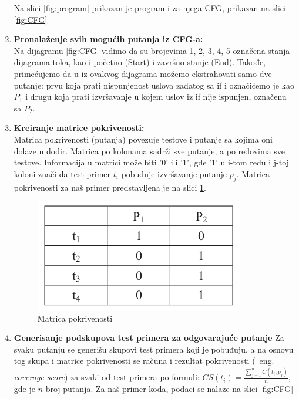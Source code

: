 \documentclass[a4paper]{article}
\begin{document}
\begin{enumerate}
        
        Na slici \ref{fig:program} prikazan je program i za njega CFG, prikazan na slici \ref{fig:CFG}
    \item \textbf{Pronalaženje svih mogućih putanja iz CFG-a:}\\
        Na dijagramu \ref{fig:CFG} vidimo da su brojevima 1, 2, 3, 4, 5 označena stanja dijagrama toka, kao i početno (Start) i završno stanje (End). Takođe, primećujemo da u iz ovakvog dijagrama možemo ekstrahovati samo dve putanje: prvu koja prati nispunjenost uslova zadatog sa if i označićemo je kao $P_1$ i drugu koja prati izvršavanje u kojem uslov iz if nije ispunjen, označenu sa $P_2$.
    \item \textbf{Kreiranje matrice pokrivenosti:} \\
        Matrica pokrivenosti (putanja) povezuje testove i putanje sa kojima oni dolaze u dodir. Matrica po kolonama sadrži sve putanje, a po redovima sve testove. Informacija u matrici može biti '0' ili '1', gde '1' u i-tom redu i j-toj koloni znači da test primer $t_i$ pobuđuje izvršavanje putanje $p_j$. Matrica pokrivenosti za naš primer predstavljena je na slici \ref{fig:pokrivenost}.
        \begin{figure}[h!]
        \begin{center}
        \includegraphics[scale=0.4]{Coverage.png}
        \end{center}
        \caption{Matrica pokrivenosti}
        \label{fig:pokrivenost}
        \end{figure}
    \item \textbf{Generisanje podskupova test primera za odgovarajuće putanje}
    Za svaku putanju se generišu skupovi test primera koji je pobuđuju, a na osnovu tog skupa i matrice pokrivenosti se računa i rezultat pokrivenosti (~eng. \textit{coverage score}) za svaki od test primera po formuli: $CS(t_i) = \frac{\sum_{j=1}^{n}C(t_i, p_j)}{n} $, gde je $n$ broj putanja.
    Za naš primer koda, podaci se nalaze na slici
    \ref{fig:CFG}
        \begin{figure}[h!]
        \begin{center}

\end{center}
\end{figure}
\end{enumerate}
\end{document}
